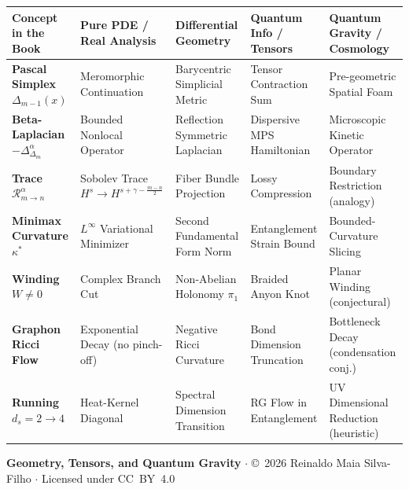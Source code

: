 \documentclass[11pt,a4paper,oneside]{article}
\begin{document}
\begin{table}[!htbp]
\centering
\scriptsize
\renewcommand{\arraystretch}{1.25}
\begin{tabularx}{\textwidth}{@{} p{3.2cm} p{2.8cm} p{2.8cm} p{3cm} X @{}}
\toprule
\textbf{Concept in the Book} & \textbf{Pure PDE / Real Analysis} & \textbf{Differential Geometry} & \textbf{Quantum Info / Tensors} & \textbf{Quantum Gravity / Cosmology} \\
\midrule
\textbf{Pascal Simplex $\Delta_{m-1}(x)$} & Meromorphic Continuation & Barycentric Simplicial Metric & Tensor Contraction Sum & Pre-geometric Spatial Foam \\
\textbf{Beta-Laplacian $-\Delta_{\Delta_m}^\alpha$} & Bounded Nonlocal Operator & Reflection Symmetric Laplacian & Dispersive MPS Hamiltonian & Microscopic Kinetic Operator \\
\textbf{Trace $\mathcal{R}_{m\to n}^\alpha$} & Sobolev Trace $H^s \to H^{s+\gamma-\frac{m-n}{2}}$ & Fiber Bundle Projection & Lossy Compression & Boundary Restriction (analogy) \\
\textbf{Minimax Curvature $\kappa^*$} & $L^\infty$ Variational Minimizer & Second Fundamental Form Norm & Entanglement Strain Bound & Bounded-Curvature Slicing \\
\textbf{Winding $W \ne 0$} & Complex Branch Cut & Non-Abelian Holonomy $\pi_1$ & Braided Anyon Knot & Planar Winding (conjectural) \\
\textbf{Graphon Ricci Flow} & Exponential Decay (no pinch-off) & Negative Ricci Curvature & Bond Dimension Truncation & Bottleneck Decay (condensation conj.) \\
\textbf{Running $d_s = 2 \to 4$} & Heat-Kernel Diagonal & Spectral Dimension Transition & RG Flow in Entanglement & UV Dimensional Reduction (heuristic) \\
\bottomrule
\end{tabularx}
\end{table}

\vfill
\begin{center}
    \footnotesize \textbf{Geometry, Tensors, and Quantum Gravity} $\cdot$ \copyright~2026 Reinaldo Maia Silva-Filho $\cdot$ Licensed under CC~BY~4.0
\end{center}
\end{document}
